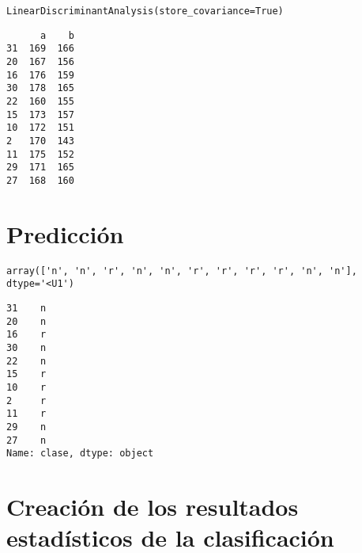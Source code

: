 \begin{verbatim}
LinearDiscriminantAnalysis(store_covariance=True)
\end{verbatim}


\begin{Shaded}
\begin{Highlighting}[]
\end{Highlighting}
\end{Shaded}

\begin{verbatim}
      a    b
31  169  166
20  167  156
16  176  159
30  178  165
22  160  155
15  173  157
10  172  151
2   170  143
11  175  152
29  171  165
27  168  160
\end{verbatim}

\section{Predicción}

\begin{Shaded}
\begin{Highlighting}[]
\OperatorTok{=}
\end{Highlighting}
\end{Shaded}

\begin{Shaded}
\begin{Highlighting}[]
\end{Highlighting}
\end{Shaded}

\begin{verbatim}
array(['n', 'n', 'r', 'n', 'n', 'r', 'r', 'r', 'r', 'n', 'n'], dtype='<U1')
\end{verbatim}


\begin{Shaded}
\begin{Highlighting}[]
\end{Highlighting}
\end{Shaded}

\begin{verbatim}
31    n
20    n
16    r
30    n
22    n
15    r
10    r
2     r
11    r
29    n
27    n
Name: clase, dtype: object
\end{verbatim}


\section{Creación de los resultados estadísticos de la clasificación}

